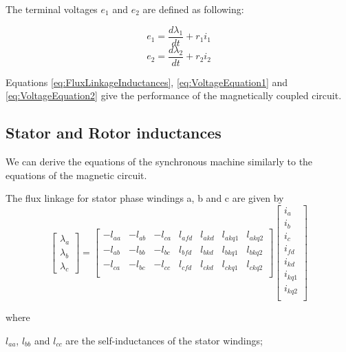 The terminal voltages $e_1$ and $e_2$ are defined as following:

\begin{equation} \label{eq:VoltageEquation1}
	e_1 = \frac{d \lambda_1}{d t} + r_1 i_1
\end{equation}
\begin{equation} \label{eq:VoltageEquation2}
	e_2 = \frac{d \lambda_2}{d t} + r_2 i_2
\end{equation}

Equations \ref{eq:FluxLinkageInductances}, \ref{eq:VoltageEquation1} and \ref{eq:VoltageEquation2} give the performance of the magnetically coupled circuit.

\subsection{Stator and Rotor inductances}


We can derive the equations of the synchronous machine similarly to the equations of the magnetic circuit.

The flux linkage for stator phase windings a, b and c are given by
\begin{equation} \label{eq:FluxStator}
	\begin{bmatrix}
		\lambda_a \\
		\lambda_b \\
		\lambda_c
	\end{bmatrix}
	=
	\begin{bmatrix}
		-l_{aa} & -l_{ab} & -l_{ca} & l_{afd} & l_{akd} & l_{akq1} & l_{akq2} \\  
		-l_{ab} & -l_{bb} & -l_{bc} & l_{bfd} & l_{bkd} & l_{bkq1} & l_{bkq2} \\  
		-l_{ca} & -l_{bc} & -l_{cc} & l_{cfd} & l_{ckd} & l_{ckq1} & l_{ckq2} \\  
	\end{bmatrix}
	\begin{bmatrix}
		i_a \\
		i_b \\
		i_c \\
		i_{fd} \\
		i_{kd} \\
		i_{kq1} \\
		i_{kq2} \\
	\end{bmatrix}
\end{equation}

where

$l_{aa}$, $l_{bb}$ and $l_{cc}$ are the self-inductances of the stator windings;


